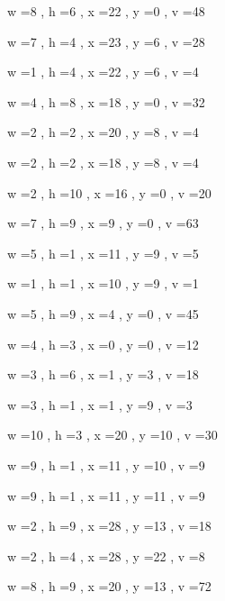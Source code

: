 \documentclass[11pt]{article}
\begin{document}
w =8 , h =6 , x =22 , y =0 , v =48
\par
w =7 , h =4 , x =23 , y =6 , v =28
\par
w =1 , h =4 , x =22 , y =6 , v =4
\par
w =4 , h =8 , x =18 , y =0 , v =32
\par
w =2 , h =2 , x =20 , y =8 , v =4
\par
w =2 , h =2 , x =18 , y =8 , v =4
\par
w =2 , h =10 , x =16 , y =0 , v =20
\par
w =7 , h =9 , x =9 , y =0 , v =63
\par
w =5 , h =1 , x =11 , y =9 , v =5
\par
w =1 , h =1 , x =10 , y =9 , v =1
\par
w =5 , h =9 , x =4 , y =0 , v =45
\par
w =4 , h =3 , x =0 , y =0 , v =12
\par
w =3 , h =6 , x =1 , y =3 , v =18
\par
w =3 , h =1 , x =1 , y =9 , v =3
\par
w =10 , h =3 , x =20 , y =10 , v =30
\par
w =9 , h =1 , x =11 , y =10 , v =9
\par
w =9 , h =1 , x =11 , y =11 , v =9
\par
w =2 , h =9 , x =28 , y =13 , v =18
\par
w =2 , h =4 , x =28 , y =22 , v =8
\par
w =8 , h =9 , x =20 , y =13 , v =72
\par
\newpage
\end{document}
